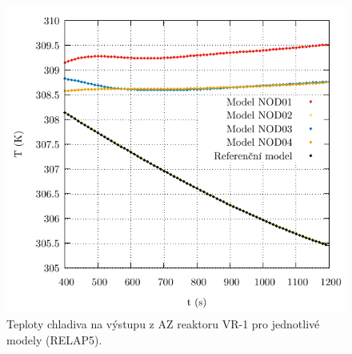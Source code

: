 \begin{figure}[H]
\begin{minipage}{.5\textwidth}
		\includegraphics[width=\linewidth]{./06_hodnoceni_TH_modelu/grafy/T_out_stationary_100.pdf}
		
	\end{minipage}
	\caption{Teploty chladiva na výstupu z AZ reaktoru VR-1 pro jednotlivé modely (RELAP5).}
	\label{fig:T_out_stationary_100}
\end{figure}




